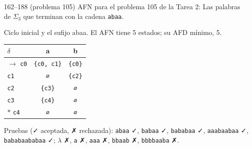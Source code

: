 \documentclass[11pt]{article}
\begin{document}
\begin{ejercicio}{162--188 (problema 105)}{}
AFN para el problema 105 de la Tarea 2: Las palabras de $\Sigma_3$ que terminan con la cadena \texttt{abaa}.
\end{ejercicio}
\proc Ciclo inicial y el sufijo abaa. El AFN tiene 5 estados; su AFD mínimo, 5.
\begin{center}\small\begin{tabular}{lcc}\toprule
$\delta$ & a & b \\\midrule
$\to$ \texttt{c0} & \texttt{\{c0, c1\}} & \texttt{\{c0\}} \\
 \texttt{c1} & \texttt{∅} & \texttt{\{c2\}} \\
 \texttt{c2} & \texttt{\{c3\}} & \texttt{∅} \\
 \texttt{c3} & \texttt{\{c4\}} & \texttt{∅} \\
$*$ \texttt{c4} & \texttt{∅} & \texttt{∅} \\
\bottomrule\end{tabular}\end{center}
Pruebas (✓ aceptada, ✗ rechazada): \texttt{abaa} ✓, \texttt{babaa} ✓, \texttt{bababaa} ✓, \texttt{aaabaabaa} ✓, \texttt{bababaababaa} ✓; $\lambda$ ✗, \texttt{a} ✗, \texttt{aaa} ✗, \texttt{bbaab} ✗, \texttt{bbbbaaba} ✗.
\end{document}
